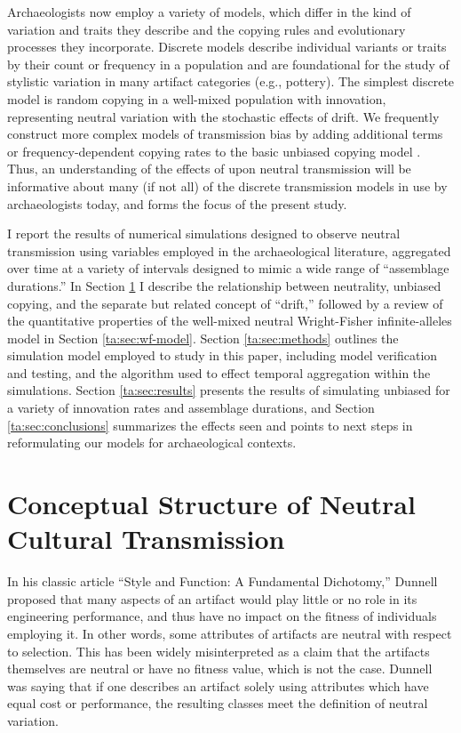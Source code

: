 Archaeologists now employ a variety of \ct models, which differ in the kind of variation and traits they describe and the copying rules and evolutionary processes they incorporate.  Discrete models describe individual variants or traits by their count or frequency in a population and are foundational for the study of stylistic variation in many artifact categories (e.g., pottery).  The simplest discrete  model is random copying in a well-mixed population with innovation, representing neutral variation with the stochastic effects of drift.  We frequently construct more complex models of transmission bias by adding additional terms or frequency-dependent copying rates to the basic unbiased copying model \citep{cavalli1973cultural,cavalli1973models,CF1981,BR1985}.  Thus, an understanding of the effects of \timeav upon neutral transmission will be informative about many (if not all) of the discrete transmission models in use by archaeologists today, and forms the focus of the present study.  

I report the results of numerical simulations designed to observe neutral transmission using variables employed in the archaeological literature, aggregated over time at a variety of intervals designed to mimic a wide range of ``assemblage durations.''  In Section \ref{ta:sec:concept-review} I describe the relationship between neutrality, unbiased copying, and the separate but related concept of ``drift,'' followed by a review of the quantitative properties of the well-mixed neutral Wright-Fisher infinite-alleles model in Section \ref{ta:sec:wf-model}.  Section \ref{ta:sec:methods} outlines the simulation model employed to study \timeav in this paper, including model verification and testing, and the algorithm used to effect temporal aggregation within the simulations.  Section \ref{ta:sec:results} presents the results of simulating unbiased \ct for a variety of innovation rates and assemblage durations, and Section \ref{ta:sec:conclusions} summarizes the effects seen and points to next steps in reformulating our \ct models for archaeological contexts.  


\section{Conceptual Structure of Neutral Cultural Transmission}
\label{ta:sec:concept-review}

In his classic article “Style and Function: A Fundamental Dichotomy,” Dunnell \citeyearpar{8961} proposed that many aspects of an artifact would play little or no role in its engineering performance, and thus have no impact on the fitness of individuals employing it. In other words, some attributes of artifacts are neutral with respect to selection.  This has been widely misinterpreted as a claim that the artifacts themselves are neutral or have no fitness value, which is not the case. Dunnell was saying that if one describes an artifact solely using attributes which have equal cost or performance, the resulting classes meet the definition of neutral variation.  

